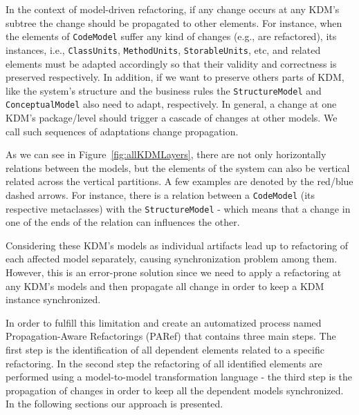 In the context of model-driven  refactoring, if any change occurs at any KDM's subtree the change should be propagated to other elements.
%
%
For instance, when the elements of \texttt{CodeModel} suffer any kind of changes (e.g., are refactored), its instances, i.e., \texttt{ClassUnits}, \texttt{MethodUnits}, \texttt{StorableUnits}, etc, and related elements must be adapted accordingly so that their validity and correctness is preserved respectively. In addition, if we want to preserve others parts of KDM, like the system's structure and the business rules the  \texttt{StructureModel} and \texttt{ConceptualModel} also need to adapt, respectively. %
In general, a change at one KDM's package/level should trigger a cascade of changes at other models. We call such sequences of adaptations change propagation.

As we can see in Figure~\ref{fig:allKDMLayers}, there are not only horizontally relations between the models, but the elements of the system can also be vertical related across the vertical partitions. A few examples are denoted by the red/blue dashed arrows. For instance, there is a relation between a \texttt{CodeModel} (its respective metaclasses) with the \texttt{StructureModel} - which means that a change in one of the ends of the relation can influences the other.

Considering these KDM's models as individual artifacts lead up to refactoring of each affected model separately, causing synchronization problem among them. However, this is an error-prone solution since we need to apply a refactoring at any KDM's models and then propagate all change in order to keep a KDM instance synchronized. %




In order to fulfill this limitation and create an automatized process named Propagation-Aware Refactorings (PARef) that contains three main steps. The first step is the identification of all dependent elements related to a specific refactoring. In the second step the refactoring of all identified elements are performed using a model-to-model transformation language - the third step is the propagation of changes in order to keep all the dependent models synchronized. %
In the following sections our approach is presented.
 
